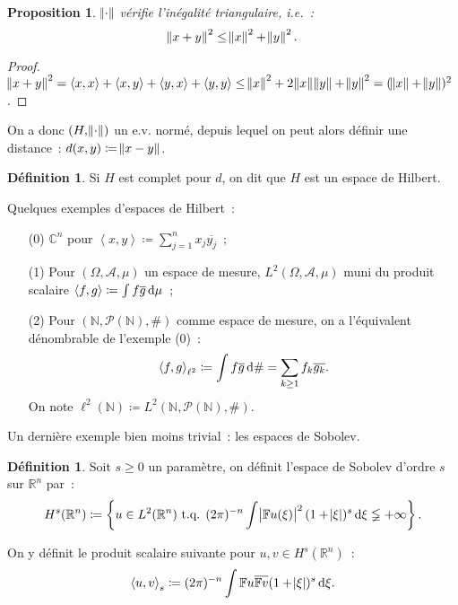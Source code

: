 \documentclass{report}
\newcommand{\C}{{\mathbb C}}
\newcommand{\R}{{\mathbb R}}
\newcommand{\N}{{\mathbb N}}
\newcommand{\scpr}[2]{\left\langle#1, #2\right\rangle}
\newcommand{\tq}{\text{ t.q. }}
\newcommand{\pinfty}{{+\infty}}
\newtheorem{prp}[thm]{Proposition}
\theoremstyle{definition}
\newtheorem{déf}[thm]{Définition}
\theoremstyle{remark}
\begin{document}
\begin{prp} $\norm \cdot$ vérifie l'inégalité triangulaire, i.e.~:
\[\norm {x+y}^2 \leq \norm x^2 + \norm y^2.\]
\end{prp}

\begin{proof} $\norm {x+y}^2 = \scpr xx + \scpr xy + \scpr yx + \scpr yy \leq \norm x^2 + 2\norm x\norm y + \norm y^2 = (\norm x + \norm y)^2$.
\end{proof}

On a donc $(H, \norm \cdot)$ un e.v. normé, depuis lequel on peut alors définir une distance~: $d(x, y) \coloneqq \norm {x-y}$.

\begin{déf} Si $H$ est complet pour $d$, on dit que $H$ est un espace de Hilbert.
\end{déf}

Quelques exemples d'espaces de Hilbert~:
\begin{itemize}
	\item[(0)] $\C^n$ pour $\scpr xy \coloneqq \sum_{j=1}^nx_j\overline {y_j}$~;
	\item[(1)] Pour $(\Omega, \mathcal A, \mu)$ un espace de mesure, $L^2(\Omega, \mathcal A, \mu)$ muni du produit scalaire $\scpr fg \coloneqq \int f\overline g\dif\mu$~;
	\item[(2)] Pour $(\N, \mathcal P(\N), \#)$ comme espace de mesure, on a l'équivalent dénombrable de l'exemple (0)~:
	\[\scpr fg_{\ell^2} \coloneqq \int f\overline g\dif\# = \sum_{k \geq 1}f_k\overline {g_k}.\]
	On note $\ell^2(\N) \coloneqq L^2(\N, \mathcal P(\N), \#)$.
\end{itemize}

Un dernière exemple bien moins trivial~: les espaces de Sobolev.

\begin{déf} Soit $s \geq 0$ un paramètre, on définit l'espace de Sobolev d'ordre $s$ sur $\R^n$ par~:
\begin{equation}
	H^s(\R^n) \coloneqq \left\{u \in L^2(\R^n) \tq (2\pi)^{-n}\int \abs {\mathbb Fu(\xi)}^2(1+\abs \xi)^s\dif\xi \lneqq \pinfty\right\}.
\end{equation}

On y définit le produit scalaire suivante pour $u, v \in H^s(\R^n)$~:
\begin{equation}
	\scpr uv_s \coloneqq (2\pi)^{-n}\int\mathbb Fu\overline {\mathbb Fv}(1+\abs\xi)^s\dif\xi.
\end{equation}
\end{déf}
\end{document}
